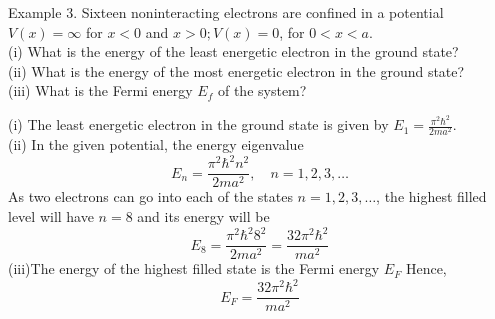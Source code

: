 \begin{exercise}
	Example 3. Sixteen noninteracting electrons are confined in a potential $V(x)=\infty$ for $x<0$ and $x>0 ; V(x)=0$, for $0<x<a$.\\
	(i) What is the energy of the least energetic electron in the ground state?\\
	(ii) What is the energy of the most energetic electron in the ground state?\\
	(iii) What is the Fermi energy $E_{f}$ of the system?
	\end{exercise}
\begin{answer}
	(i) The least energetic electron in the ground state is given by $E_{1}=\frac{\pi^{2} \hbar^{2}}{2 m a^{2}}$.\\
	(ii) In the given potential, the energy eigenvalue
	$$
	E_{n}=\frac{\pi^{2} \hbar^{2} n^{2}}{2 m a^{2}}, \quad n=1,2,3, \ldots
	$$
	As two electrons can go into each of the states $n=1,2,3, \ldots$, the highest filled level will have $n=8$ and its energy will be
	$$
	E_{8}=\frac{\pi^{2} \hbar^{2} 8^{2}}{2 m a^{2}}=\frac{32 \pi^{2} \hbar^{2}}{m a^{2}}
	$$
	(iii)The energy of the highest filled state is the Fermi energy $E_{F}$ Hence,
	$$
	E_{F}=\frac{32 \pi^{2} \hbar^{2}}{m a^{2}}
	$$
\end{answer}


